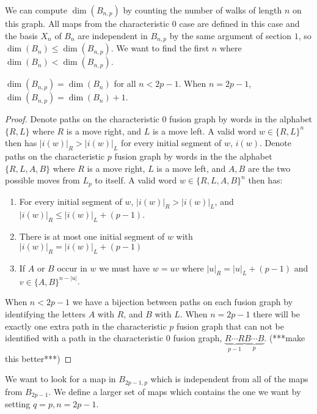 \documentclass[11pt]{article} %
\begin{document}
We can compute $\dim(B_{n,p})$ by counting the number of walks of length $n$ on this graph. All maps from the characteristic $0$ case are defined in this case and the basis $X_n$ of $B_n$ are independent in $B_{n,p}$ by the same argument of section $1$, so $\dim(B_n) \leq \dim(B_{n,p})$. We want to find the first $n$ where $\dim(B_n) < \dim(B_{n,p})$.

\begin{proposition}
$\dim(B_{n,p}) = \dim(B_n)$ for all $n < 2p-1$. When $n=2p-1$, $\dim(B_{n,p}) = \dim(B_n) + 1$.
\begin{proof} 
Denote paths on the characteristic $0$ fusion graph by words in the alphabet $\{R,L\}$ where $R$ is a move right, and $L$ is a move left. A valid word $w \in \{R,L\}^{n}$ then has $|i(w)|_{R}>|i(w)|_{L}$ for every initial segment of $w$, $i(w)$. Denote paths on the characteristic $p$ fusion graph by words in the the alphabet $\{R,L,A,B\}$ where $R$ is a move right, $L$ is a move left, and $A,B$ are the two possible moves from $L_p$ to itself. A valid word $w \in \{R,L,A,B\}^n$ then has:
\begin{enumerate}
\item For every initial segment of $w$, $|i(w)|_{R} > |i(w)|_{L}$, and $|i(w)|_R \leq |i(w)|_L + (p-1)$.
\item There is at most one initial segment of $w$ with $|i(w)|_R = |i(w)|_L + (p-1)$
\item If $A$ or $B$ occur in $w$ we must have $w = uv$ where $|u|_R = |u|_L + (p-1)$ and $v \in \{A,B\}^{n-|u|}$. 
\end{enumerate}
When $n<2p-1$ we have a bijection between paths on each fusion graph by identifying the letters $A$ with $R$, and $B$ with $L$. When $n=2p-1$ there will be exactly one extra path in the characteristic $p$ fusion graph that can not be identified with a path in the characteristic $0$ fusion graph, $\underbrace{R\cdots R}_{p-1}\underbrace{B\cdots B}_{p}$. (***make this better***)

\end{proof} 
\end{proposition} 

We want to look for a map in $B_{2p-1,p}$ which is independent from all of the maps from $B_{2p-1}$. We define a larger set of maps which contains the one we want by setting $q=p,n=2p-1$.
\end{document}

